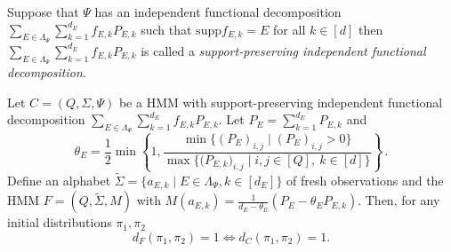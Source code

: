 \documentclass[a4paper,UKenglish,cleveref, autoref,mathscr]{lipics-v2019}
\newcommand{\1}{\mathbbm{1}}
\newcommand{\supp}{\mathrm{supp}}
\begin{document}
Suppose that $\Psi$ has an independent functional decomposition $\sum_{E \in \Lambda_{\Psi}} \sum_{k = 1}^{d_E} f_{E,k} P_{E,k}$ such that $\supp f_{E, k} = E$ for all $k \in [d]$ then $\sum_{E \in \Lambda_{\Psi}} \sum_{k = 1}^{d_E} f_{E,k} P_{E,k}$ is called a \emph{support-preserving independent functional decomposition}.

\begin{proposition}
Let $C = (Q, \Sigma, \Psi)$ be a HMM with support-preserving independent functional decomposition $\sum_{E \in \Lambda_{\Psi}} \sum_{k = 1}^{d_E} f_{E,k} P_{E,k}$. Let $P_E = \sum_{k = 1}^{d_E} P_{E,k}$ and 
\[\theta_E = \frac12 \min \left\{ 1, \frac{\min \{(P_E)_{i,j} \mid (P_E)_{i,j} > 0\}}{\max \{ \big(P_{E,k}\big)_{i,j} \mid i,j \in [Q],\ k \in [d] \} } \right\}\,. \]
Define an alphabet $\tilde{\Sigma} = \{a_{E, k} \mid E \in \Lambda_{\Psi}, k \in [d_E] \}$ of fresh observations and the HMM $F = (Q, \tilde{\Sigma}, M)$ with $M(a_{E, k}) = \frac{1}{d_E - \theta_E} (P_E - \theta_E P_{E, k})$. Then, for any initial distributions $\pi_1, \pi_2$
\[d_F(\pi_1, \pi_2) = 1 \iff d_C(\pi_1, \pi_2) = 1.\]
\end{proposition}
\end{document}
